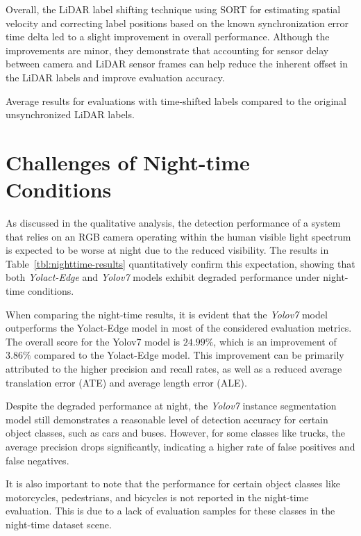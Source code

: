 Overall, the LiDAR label shifting technique using SORT for estimating spatial velocity and correcting label positions based on the known synchronization error time delta led to a slight improvement in overall performance.
Although the improvements are minor, they demonstrate that accounting for sensor delay between camera and LiDAR sensor frames can help reduce the inherent offset in the LiDAR labels and improve evaluation accuracy.

\begin{table}[htb]
    
    \caption{Average results for evaluations with time-shifted labels compared to the original unsynchronized LiDAR labels.}
    \label{tbl:label-shift-results}
\end{table}


\section{Challenges of Night-time Conditions}
\label{sec:weather}

As discussed in the qualitative analysis, the detection performance of a system that relies on an RGB camera operating within the human visible light spectrum is expected to be worse at night due to the reduced visibility.
The results in Table~\ref{tbl:nighttime-results} quantitatively confirm this expectation, showing that both \textit{Yolact-Edge} and \textit{Yolov7} models exhibit degraded performance under night-time conditions.

When comparing the night-time results, it is evident that the \textit{Yolov7} model outperforms the Yolact-Edge model in most of the considered evaluation metrics.
The overall score for the Yolov7 model is $24.99\%$, which is an improvement of $3.86\%$ compared to the Yolact-Edge model.
This improvement can be primarily attributed to the higher precision and recall rates, as well as a reduced average translation error (ATE) and average length error (ALE).

Despite the degraded performance at night, the \textit{Yolov7} instance segmentation model still demonstrates a reasonable level of detection accuracy for certain object classes, such as cars and buses.
However, for some classes like trucks, the average precision drops significantly, indicating a higher rate of false positives and false negatives.

It is also important to note that the performance for certain object classes like motorcycles, pedestrians, and bicycles is not reported in the night-time evaluation.
This is due to a lack of evaluation samples for these classes in the night-time dataset scene.

